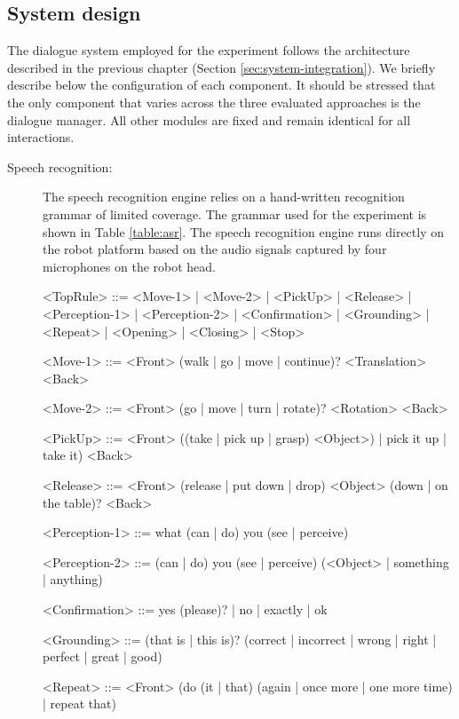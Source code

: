 \subsection{System design}

The dialogue system employed for the experiment follows the architecture described in the previous chapter (Section \ref{sec:system-integration}).  We briefly describe below the configuration of each component. It should be stressed that the only component that varies across the three evaluated approaches is the dialogue manager.  All other modules are fixed and remain identical for all interactions.

\begin{description}
\item[Speech recognition: ] The speech recognition engine relies on a hand-written recognition grammar of limited coverage. The grammar used for the experiment is shown in Table \ref{table:asr}.  The speech recognition engine runs directly on the robot platform based on the audio signals captured by four microphones on the robot head.


\begin{table}[p!]
\vspace{2cm}
\begin{grammar}

<TopRule> ::= <Move-1> | <Move-2> | <PickUp> | <Release> | <Perception-1> | <Perception-2> | <Confirmation> | <Grounding> | <Repeat> | <Opening> | <Closing> | <Stop> 

<Move-1> ::= <Front> (walk | go | move | continue)? <Translation> <Back>

<Move-2> ::= <Front> (go | move | turn | rotate)? <Rotation> <Back>

<PickUp> ::= <Front> ((take | pick up | grasp) <Object>) | pick it up | take it) <Back>

<Release> ::= <Front> (release | put down | drop) <Object> (down | on the table)? <Back>

<Perception-1> ::= what (can | do) you (see | perceive)

<Perception-2> ::= (can | do) you (see | perceive) (<Object> | something | anything)

<Confirmation> ::= yes (please)? | no | exactly | ok 

<Grounding> ::= (that is | this is)? (correct | incorrect | wrong | right | perfect | great | good) 

<Repeat> ::= <Front> (do (it | that) (again | once more | one more time) | repeat that)


\end{grammar}
\end{table}
\end{description}
